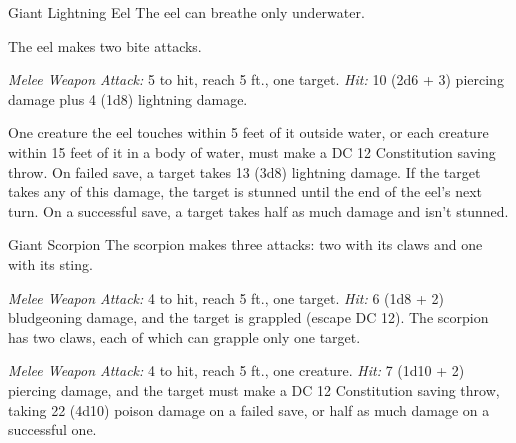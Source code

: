 \documentclass[10pt,a4paper,twoside,bg=print,twocolumn,openany,nodeprecatedcode]{dndbook}
\begin{document}
\begin{DndMonster}[float=t]{Giant Lightning Eel}
\DndMonsterBasics[
armor-class = {13},
hit-points = {\DndDice{5d10 + 15}},
speed = {5 ft., swim 30 ft.}
]
\DndMonsterAbilityScores[
 str = 11,
 dex = 17,
 con = 16,
 int = 2,
 wis = 12,
 cha = 3
]
\DndMonsterDetails[
damage-resistances = {lightning},
senses = {blindsight 60 ft., passive perception 11},
challenge = 3,
]
The eel can breathe only underwater.

The eel makes two bite attacks.

\textsl{Melee Weapon Attack:} 5 to hit, reach 5 ft., one target. \textsl{Hit:} 10 (2d6 + 3) piercing damage plus 4 (1d8) lightning damage.

One creature the eel touches within 5 feet of it outside water, or each creature within 15 feet of it in a body of water, must make a DC 12 Constitution saving throw. On failed save, a target takes 13 (3d8) lightning damage. If the target takes any of this damage, the target is stunned until the end of the eel's next turn. On a successful save, a target takes half as much damage and isn't stunned.

\end{DndMonster}



\begin{DndMonster}[float=t]{Giant Scorpion}
\DndMonsterBasics[
armor-class = {15 (natural armor)},
hit-points = {\DndDice{7d10 + 14}},
speed = {40 ft.}
]
\DndMonsterAbilityScores[
 str = 15,
 dex = 13,
 con = 15,
 int = 1,
 wis = 9,
 cha = 3
]
\DndMonsterDetails[
senses = {blindsight 60 ft., passive perception 9},
challenge = 3,
]
The scorpion makes three attacks: two with its claws and one with its sting.

\textsl{Melee Weapon Attack:} 4 to hit, reach 5 ft., one target. \textsl{Hit:} 6 (1d8 + 2) bludgeoning damage, and the target is grappled (escape DC 12). The scorpion has two claws, each of which can grapple only one target.

\textsl{Melee Weapon Attack:} 4 to hit, reach 5 ft., one creature. \textsl{Hit:} 7 (1d10 + 2) piercing damage, and the target must make a DC 12 Constitution saving throw, taking 22 (4d10) poison damage on a failed save, or half as much damage on a successful one.

\end{DndMonster}
\end{document}
